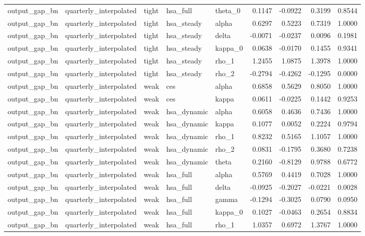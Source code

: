 \begin{tabular}{lllllrrrr}
output\_gap\_bn & quarterly\_interpolated & tight & hsa\_full & theta\_0 & 0.1147 & -0.0922 & 0.3199 & 0.8544 \\
output\_gap\_bn & quarterly\_interpolated & tight & hsa\_steady & alpha & 0.6297 & 0.5223 & 0.7319 & 1.0000 \\
output\_gap\_bn & quarterly\_interpolated & tight & hsa\_steady & delta & -0.0071 & -0.0237 & 0.0096 & 0.1981 \\
output\_gap\_bn & quarterly\_interpolated & tight & hsa\_steady & kappa\_0 & 0.0638 & -0.0170 & 0.1455 & 0.9341 \\
output\_gap\_bn & quarterly\_interpolated & tight & hsa\_steady & rho\_1 & 1.2455 & 1.0875 & 1.3978 & 1.0000 \\
output\_gap\_bn & quarterly\_interpolated & tight & hsa\_steady & rho\_2 & -0.2794 & -0.4262 & -0.1295 & 0.0000 \\
output\_gap\_bn & quarterly\_interpolated & weak & ces & alpha & 0.6858 & 0.5629 & 0.8050 & 1.0000 \\
output\_gap\_bn & quarterly\_interpolated & weak & ces & kappa & 0.0611 & -0.0225 & 0.1442 & 0.9253 \\
output\_gap\_bn & quarterly\_interpolated & weak & hsa\_dynamic & alpha & 0.6058 & 0.4636 & 0.7436 & 1.0000 \\
output\_gap\_bn & quarterly\_interpolated & weak & hsa\_dynamic & kappa & 0.1077 & 0.0052 & 0.2224 & 0.9794 \\
output\_gap\_bn & quarterly\_interpolated & weak & hsa\_dynamic & rho\_1 & 0.8232 & 0.5165 & 1.1057 & 1.0000 \\
output\_gap\_bn & quarterly\_interpolated & weak & hsa\_dynamic & rho\_2 & 0.0831 & -0.1795 & 0.3680 & 0.7238 \\
output\_gap\_bn & quarterly\_interpolated & weak & hsa\_dynamic & theta & 0.2160 & -0.8129 & 0.9788 & 0.6772 \\
output\_gap\_bn & quarterly\_interpolated & weak & hsa\_full & alpha & 0.5769 & 0.4419 & 0.7028 & 1.0000 \\
output\_gap\_bn & quarterly\_interpolated & weak & hsa\_full & delta & -0.0925 & -0.2027 & -0.0221 & 0.0028 \\
output\_gap\_bn & quarterly\_interpolated & weak & hsa\_full & gamma & -0.1294 & -0.3025 & 0.0790 & 0.0950 \\
output\_gap\_bn & quarterly\_interpolated & weak & hsa\_full & kappa\_0 & 0.1027 & -0.0463 & 0.2654 & 0.8834 \\
output\_gap\_bn & quarterly\_interpolated & weak & hsa\_full & rho\_1 & 1.0357 & 0.6972 & 1.3767 & 1.0000 \\

\end{tabular}
